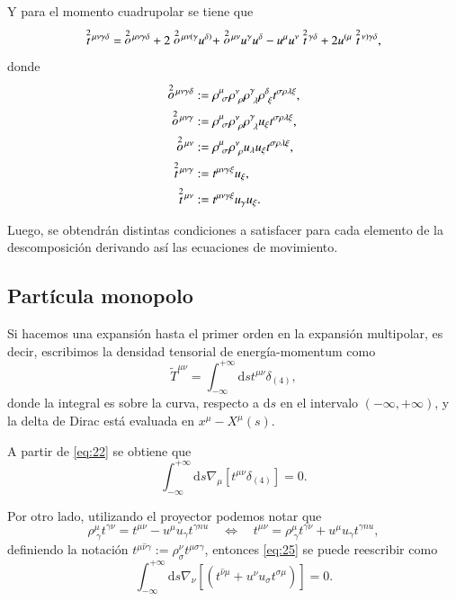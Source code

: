 Y para el momento cuadrupolar se tiene que
\begin{equation}
\des{2}{t}^{\mu \nu \gamma \delta} = \ \des{2}{o}^{\mu \nu \gamma \delta} + 2 \des{2}{o}^{\mu \nu (\gamma} u^{\delta)} + \des{2}{o}^{\mu \nu} u^{\gamma} u^{\delta} - u^{\mu} u^{\nu} \des{2}{t}^{\gamma \delta} + 2 u^{(\mu} \des{2}{t}^{\nu) \gamma \delta},
\end{equation}
donde
\begin{align*}
\des{2}{o}^{\mu \nu \gamma \delta} &:= \rho^{\mu}_{\ \sigma} \rho^{\nu}_{\ \rho} \rho^{\gamma}_{\ \lambda} \rho^{\delta}_{\ \xi} t^{\sigma \rho \lambda \xi},\\
\des{2}{o}^{\mu \nu \gamma} &:= \rho^{\mu}_{\ \sigma} \rho^{\nu}_{\ \rho} \rho^{\gamma}_{\ \lambda} u_{\xi} t^{\sigma \rho \lambda \xi},\\
\des{2}{o}^{\mu \nu} &:= \rho^{\mu}_{\ \sigma} \rho^{\nu}_{\ \rho} u_{\lambda} u_{\xi} t^{\sigma \rho \lambda \xi},\\
\des{2}{t}^{\mu \nu \gamma} &:= t^{\mu \nu \gamma \xi} u_{\xi},\\
 \des{2}{t}^{\mu \nu} &:= t^{\mu \nu \gamma \xi} u_{\gamma} u_{\xi}.
\end{align*}

Luego, se obtendrán distintas condiciones a satisfacer para cada elemento de la descomposición derivando así las ecuaciones de movimiento.

\subsection{Partícula monopolo}

Si hacemos una expansión hasta el primer orden en la expansión multipolar, es decir, escribimos la densidad tensorial de energía-momentum como
\begin{equation}
\tilde{T}^{\mu \nu} = \int_{-\infty}^{+\infty} \mathrm{d}s t^{\mu \nu} \delta_{(4)},
\end{equation}
donde la integral es sobre la curva, respecto a $\mathrm{d}s$ en el intervalo $(-\infty,+\infty)$, y la delta de Dirac está evaluada en $x^{\mu} - X^{\mu}(s)$.

A partir de \eqref{eq:22} se obtiene que
\begin{equation}
\label{eq:25}
\int_{-\infty}^{+\infty} \mathrm{d}s \nabla_{\mu} [ t^{\mu \nu} \delta_{(4)}] = 0.
\end{equation}

Por otro lado, utilizando el proyector podemos notar que
\begin{equation}
\rho^{\mu}_{\ \gamma} t^{\gamma \nu} = t^{\mu \nu} - u^{\mu} u_{\gamma} t^{\gamma nu}
\quad \Longleftrightarrow \quad t^{\mu \nu} = \rho^{\mu}_{\ \gamma} t^{\gamma \nu} + u^{\mu} u_{\gamma} t^{\gamma nu},
\end{equation}
definiendo la notación $t^{\mu \hat{\nu} \gamma} := \rho^{\nu}_{\sigma} t^{\mu \sigma \gamma} $, entonces  \eqref{eq:25} se puede reescribir como
\begin{equation}
\label{eq:26}
\int_{-\infty}^{+\infty} \mathrm{d}s \nabla_{\nu} [(t^{\hat{\nu} \mu} + u^{\nu} u_{\sigma} t^{\sigma \mu} )] = 0.
\end{equation}


